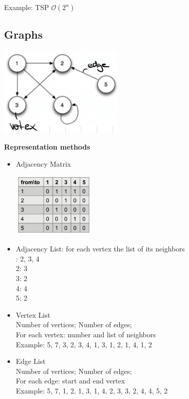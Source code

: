 \documentclass[10pt,a4paper,twocolumn]{article}
\begin{document}
Example: TSP $\mathcal{O}(2^n)$



\subsection{Graphs}
\begin{center}
	\includegraphics[width=6cm]{images/graphs}
\end{center}

\textbf{Representation methods}\\
\begin{itemize}
	\item Adjacency Matrix
		\begin{center}
			\includegraphics[width=4cm]{images/adjacency-matrix-example}
		\end{center}
	\item Adjacency List: for each vertex the list of its neighbors\\
		: 2, 3, 4\\
		2: 3\\
		3: 2\\
		4: 4\\
		5: 2
	\item Vertex List\\
		Number of vertices; Number of edges;\\
		For each vertex: number and list of neighbors\\
		Example: 5, 7, 3, 2, 3, 4, 1, 3, 1, 2, 1, 4, 1, 2
		
	\item Edge List\\
		Number of vertices; Number of edges;\\
		For each edge: start and end vertex\\
		Example: 5, 7, 1, 2, 1, 3, 1, 4, 2, 3, 3, 2, 4, 4, 5, 2
\end{itemize}
\end{document}
